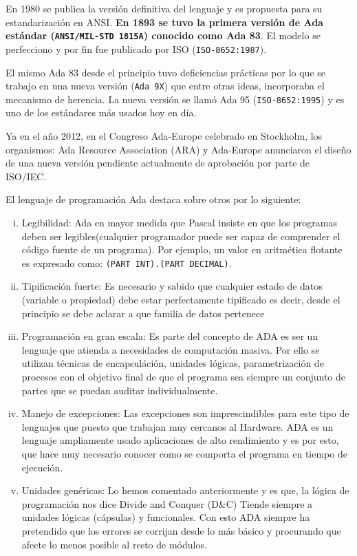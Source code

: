 En 1980 se publica la versión definitiva del lenguaje y es propuesta para su
estandarización en ANSI. \textbf{En 1893 se tuvo la primera versión de Ada
estándar (\texttt{ANSI/MIL-STD 1815A}) conocido como Ada 83}. El modelo
se perfecciono y por fin fue publicado por ISO (\texttt{ISO-8652:1987}).


El mismo Ada 83 desde el principio tuvo deficiencias prácticas por lo que se
trabajo en una nueva versión (\texttt{Ada 9X}) que entre otras ideas,
incorporaba el mecanismo de herencia. La nueva versión se llamó Ada 95
(\texttt{ISO-8652:1995}) y es uno de los estándares más usados hoy en día.

Ya en el año 2012, en el Congreso Ada-Europe celebrado en Stockholm, los
organismos: Ada Resource Association (ARA) y Ada-Europe anunciaron el
diseño de una nueva versión pendiente actualmente de aprobación por parte de
ISO/IEC.



El lenguaje de programación Ada destaca sobre otros por lo siguiente:

\begin{enumerate}[i.]

\item Legibilidad: Ada en mayor medida que Pascal insiste en que los programas
deben ser legibles(cualquier programador puede ser capaz de comprender el código
fuente de un programa). Por ejemplo, un valor en aritmética flotante es expresado como: \texttt{(PART INT).(PART DECIMAL)}.

\item Tipificación fuerte: Es necesario y sabido que cualquier estado de datos
(variable o propiedad) debe estar perfectamente tipificado es decir, desde el
principio se debe aclarar a que familia de datos pertenece 

\item Programación en gran escala: Es parte del concepto de ADA es ser un
lenguaje que atienda a necesidades de computación masiva. Por ello se utilizan
técnicas de encapsuláción, unidades lógicas, parametrización de procesos con el
objetivo final de que el programa sea siempre un conjunto de partes que se puedan
auditar individualmente.

\item Manejo de excepciones: Las excepciones son imprescindibles para este tipo de lenguajes que puesto que trabajan muy cercanos al
Hardware. ADA es un lenguaje ampliamente usado aplicaciones de alto rendimiento y es
por esto, que hace muy necesario conocer como se comporta el programa en tiempo de 
ejecución.

\item Unidades genéricas: Lo hemos comentado anteriormente y es que, la lógica
de programación nos dice Divide and Conquer (D\&C) Tiende siempre a unidades lógicas (cápsulas) y funcionales. Con
esto ADA siempre ha pretendido que los errores se corrijan desde lo más básico y
procurando que afecte lo menos posible al resto de módulos.

\end{enumerate}

